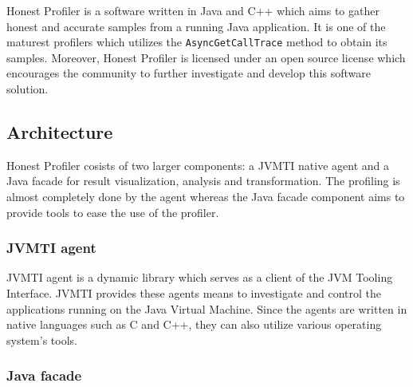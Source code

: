 \documentclass[..thesis.tex]{subfiles}
\begin{document}
Honest Profiler \cite{hon_prof} is a software written in Java and C++ which aims to gather honest and accurate samples from a running Java application. It is one of the maturest profilers which utilizes the \texttt{AsyncGetCallTrace} method to obtain its samples.  Moreover, Honest Profiler is licensed under an open source license which encourages the community to further investigate and develop this software solution.

\subsection{Architecture}
Honest Profiler cosists of two larger components: a JVMTI native agent and a Java facade for result visualization, analysis and transformation. The profiling is almost completely done by the agent whereas the Java facade component aims to provide tools to ease the use of the profiler.

\subsubsection{JVMTI agent}
JVMTI agent is a dynamic library which serves as a client of the JVM Tooling Interface. JVMTI provides these agents means to investigate and control the applications running on the Java Virtual Machine. Since the agents are written in native languages such as C and C++, they can also utilize various operating system's tools.



\subsubsection{Java facade}
\end{document}

